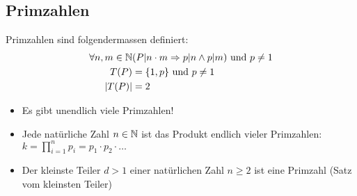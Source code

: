 % 
% 

\subsection{Primzahlen}
Primzahlen sind folgendermassen definiert:
\begin{align*}
 \forall n, m \in \mathbb{N}& (P|n \cdot m \Rightarrow p |n \wedge p | m) \mbox{ und } p \neq 1\\
  T(P) & = \{1, p\} \mbox{ und } p \neq 1\\
  |T(P)|& = 2\\
\end{align*}
\begin{itemize}\itemsep0em
\item Es gibt unendlich viele Primzahlen!
\item Jede natürliche Zahl $n \in \mathbb{N}$ ist das Produkt endlich vieler Primzahlen: $k = \prod_{i=1}^n p_i = p_1 \cdot p_2 \cdot \dots$
\item Der kleinste Teiler $d > 1$ einer natürlichen Zahl $n \geq 2$ ist eine Primzahl (Satz vom kleinsten Teiler) 
\end{itemize}

